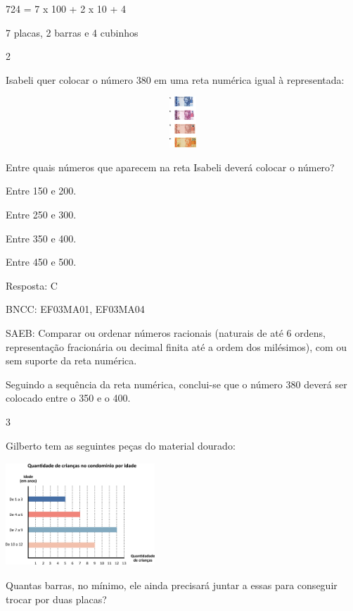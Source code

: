 \begin{escolha}
{\begin{escolha}
{724 = 7 x 100 + 2 x 10 + 4

7 placas, 2 barras e 4 cubinhos

\num{2}

Isabeli quer colocar o número 380 em uma reta numérica igual à representada:


\includegraphics[width=5.90556in,height=0.74931in]{media/image117.png}

Entre quais números que aparecem na reta Isabeli deverá colocar o número?

\begin{escolha}
\item
  Entre 150 e 200.
\item
  Entre 250 e 300.
\item
  Entre 350 e 400.
\item
  Entre 450 e 500.
\end{escolha}

Resposta: C

BNCC: EF03MA01, EF03MA04

SAEB: Comparar ou ordenar números racionais (naturais de até
6 ordens, representação fracionária ou decimal finita até a ordem dos
milésimos), com ou sem suporte da reta numérica.

Seguindo a sequência da reta numérica, conclui-se que o número 380 deverá ser colocado entre o 350 e o 400.

\num{3}

Gilberto tem as seguintes peças do material dourado:


\includegraphics[width=2.20852in,height=1.52513in]{media/image118.png}

Quantas barras, no mínimo, ele ainda precisará juntar a essas para conseguir trocar por duas placas?

}
\end{escolha}}
\end{escolha}
